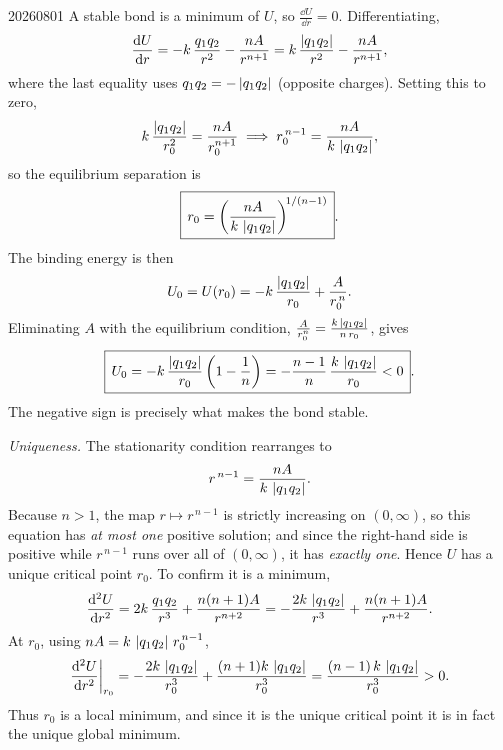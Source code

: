 \begin{solution}{20260801}
A stable bond is a minimum of $U$, so $\frac{\dd U}{\dd r} = 0$.  Differentiating,
\[
  \frac{\mathop{}\!\mathrm{d}U}{\mathop{}\!\mathrm{d}r}
  = -k\,\frac{q_1 q_2}{r^{2}} - \frac{nA}{r^{n+1}}
  = k\,\frac{\left\lvert q_1 q_2 \right\rvert}{r^{2}} - \frac{nA}{r^{n+1}},
\]
where the last equality uses $q_1 q_2 = -\left\lvert q_1 q_2 \right\rvert$ (opposite charges).  Setting this to zero,
\[
  k\,\frac{\left\lvert q_1 q_2 \right\rvert}{r_0^{2}} = \frac{nA}{r_0^{n+1}}
  \;\Longrightarrow\;
  r_0^{\,n-1} = \frac{nA}{k\,\left\lvert q_1 q_2 \right\rvert},
\]
so the equilibrium separation is
\[
  \boxed{\,r_0 = \left(\frac{nA}{k\,\left\lvert q_1 q_2 \right\rvert}\right)^{\!1/(n-1)}\,}.
\]
The binding energy is then
\[
  U_0 = U(r_0) = -k\,\frac{\left\lvert q_1 q_2 \right\rvert}{r_0} + \frac{A}{r_0^{\,n}}.
\]
Eliminating $A$ with the equilibrium condition, $\frac{A}{r_0^n} = \frac{k\,\left\lvert q_1 q_2 \right\rvert}{n\,r_0}$, gives
\[
  \boxed{\,U_0 = -k\,\frac{\left\lvert q_1 q_2 \right\rvert}{r_0}\left(1-\frac{1}{n}\right)
               = -\frac{n-1}{n}\,\frac{k\,\left\lvert q_1 q_2 \right\rvert}{r_0} < 0\,}.
\]
The negative sign is precisely what makes the bond stable.

\emph{Uniqueness.}  The stationarity condition rearranges to
\[
  r^{\,n-1} = \frac{nA}{k\,\left\lvert q_1 q_2 \right\rvert}.
\]
Because $n > 1$, the map $r \mapsto r^{\,n-1}$ is strictly increasing on $(0,\infty)$, so this equation has \emph{at most one} positive solution; and since the right-hand side is positive while $r^{\,n-1}$ runs over all of $(0,\infty)$, it has \emph{exactly one}.  Hence $U$ has a unique critical point $r_0$.  To confirm it is a minimum,
\[
  \frac{\mathrm{d}^{2}U}{\mathrm{d}r^{2}}
  = 2k\,\frac{q_1 q_2}{r^{3}} + \frac{n(n+1)A}{r^{n+2}}
  = -\frac{2k\,\left\lvert q_1 q_2 \right\rvert}{r^{3}} + \frac{n(n+1)A}{r^{n+2}}.
\]
At $r_0$, using $nA = k\,\left\lvert q_1 q_2 \right\rvert\,r_0^{\,n-1}$,
\[
  \frac{\mathrm{d}^{2}U}{\mathrm{d}r^{2}}\bigg|_{r_0}
  = -\frac{2k\,\left\lvert q_1 q_2 \right\rvert}{r_0^{3}} + \frac{(n+1)k\,\left\lvert q_1 q_2 \right\rvert}{r_0^{3}}
  = \frac{(n-1)\,k\,\left\lvert q_1 q_2 \right\rvert}{r_0^{3}} > 0.
\]
Thus $r_0$ is a local minimum, and since it is the unique critical point it is in fact the unique global minimum.

\end{solution}


